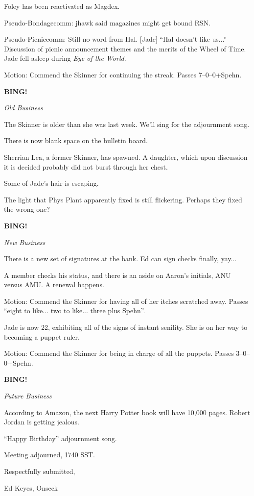 \documentclass[12pt]{article}
\newcommand{\bing}{{\bf BING!} }
\newcommand{\goto}[1]{\bing \vskip 12pt \centerline{{\em{#1}}}}
\begin{document}
Foley has been reactivated as Magdex.

Pseudo-Bondagecomm: jhawk said magazines might get bound RSN.

Pseudo-Picniccomm: Still no word from Hal.  [Jade] ``Hal doesn't
like us...''  Discussion of picnic announcement themes and the merits
of the Wheel of Time.  Jade fell asleep during {\em Eye of the World}.

Motion: Commend the Skinner for continuing the streak.  Passes
7--0--0+Spehn.

\goto{Old Business}

The Skinner is older than she was last week.  We'll sing for the
adjournment song.

There is now blank space on the bulletin board.

Sherrian Lea, a former Skinner, has spawned.  A daughter, which upon
discussion it is decided probably did not burst through her chest.

Some of Jade's hair is escaping.

The light that Phys Plant apparently fixed is still flickering.  Perhaps
they fixed the wrong one?

\goto{New Business}

There is a new set of signatures at the bank.  Ed can sign checks
finally, yay...

A member checks his status, and there is an aside on Aaron's initials,
ANU versus AMU.  A renewal happens.

Motion: Commend the Skinner for having all of her itches scratched
away.  Passes ``eight to like... two to like... three plus Spehn''.

Jade is now 22, exhibiting all of the signs of instant senility.  She
is on her way to becoming a puppet ruler.

Motion: Commend the Skinner for being in charge of all the puppets.
Passes 3--0--0+Spehn.

\goto{Future Business}

According to Amazon, the next Harry Potter book will have 10,000
pages.  Robert Jordan is getting jealous.

``Happy Birthday'' adjournment song.

\vspace{12pt}

\noindent
Meeting adjourned, 1740 SST.

\vspace{18pt}

\centerline{Respectfully submitted,}
\centerline{Ed Keyes, Onseck}
\end{document}
